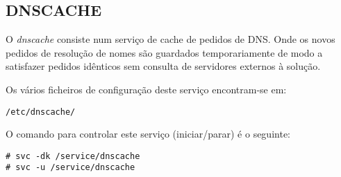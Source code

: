 \subsection{DNSCACHE}

O \emph{dnscache} consiste num serviço de cache de pedidos de DNS. Onde
os novos pedidos de resolução de nomes são guardados temporariamente de
modo a satisfazer pedidos idênticos sem consulta de servidores externos 
à solução.

Os vários ficheiros de configuração deste serviço encontram-se em:

\begin{Verbatim}[commandchars=\\\{\}]
/etc/dnscache/
\end{Verbatim}

O comando para controlar este serviço (iniciar/parar) é o seguinte:

\begin{Verbatim}[commandchars=\\\{\}]
# svc -dk /service/dnscache
# svc -u /service/dnscache
\end{Verbatim}

